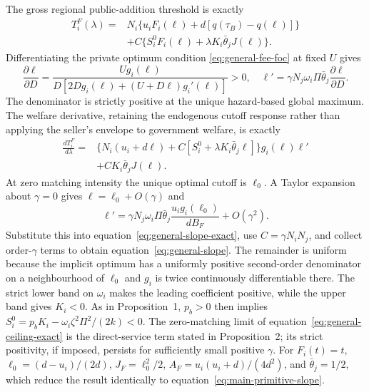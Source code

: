 The gross regional public-addition threshold is exactly
\begin{equation}
 \begin{split}
 T_i^F(\lambda)={}&N_i\bigl\{u_iF_i(\ell)
             +d[q(\tau_B)-q(\ell)]\bigr\}\\
 &+C\bigl\{S_i^0F_i(\ell)
          +\lambda K_i\bar\theta_j J(\ell)\bigr\}.
 \end{split}\label{eq:general-ceiling-exact}
\end{equation}
Differentiating the private optimum condition
\eqref{eq:general-fee-foc} at fixed $U$ gives
\begin{equation}
 \frac{\partial\ell}{\partial D}
 =\frac{U g_i(\ell)}{D[2Dg_i(\ell)+(U+D\ell)g_i'(\ell)]}>0,
 \quad
 \ell'=\gamma N_j\omega_i\Pi\bar\theta_j
              \frac{\partial\ell}{\partial D}.
 \label{eq:general-cutoff-response}
\end{equation}
The denominator is strictly positive at the unique
hazard-based global maximum. The welfare derivative, retaining the
endogenous cutoff response rather than applying the seller's envelope
to government welfare, is exactly
\begin{equation}
 \begin{split}
 \frac{dT_i^F}{d\lambda}={}&
 \bigl\{N_i(u_i+d\ell)+
   C[S_i^0+\lambda K_i\bar\theta_j\ell]\bigr\}
     g_i(\ell)\ell'\\
 &+CK_i\bar\theta_j J(\ell).
 \end{split}\label{eq:general-slope-exact}
\end{equation}
At zero matching intensity the unique optimal cutoff is
$\ell_0$. A Taylor expansion about $\gamma=0$ gives
$\ell=\ell_0+O(\gamma)$ and
\[
 \ell'=\gamma N_j\omega_i\Pi\bar\theta_j
   \frac{u_i g_i(\ell_0)}{d B_F}+O(\gamma^2).
\]
Substitute this into equation~\eqref{eq:general-slope-exact}, use
$C=\gamma N_iN_j$, and collect order-$\gamma$ terms to obtain
equation~\eqref{eq:general-slope}. The remainder is uniform because
the implicit optimum has a uniformly positive second-order
denominator on a neighbourhood of $\ell_0$ and $g_i$ is twice
continuously differentiable there. The strict lower band on
$\omega_i$ makes the leading coefficient positive, while the upper
band gives $K_i<0$. As in Proposition~1, $p_b>0$ then implies
$S_i^0=p_bK_i-\omega_i\zeta^2\Pi^2/(2k)<0$.
The zero-matching limit of equation~\eqref{eq:general-ceiling-exact}
is the direct-service term stated in Proposition~2;
its strict positivity, if imposed, persists for sufficiently small
positive $\gamma$. For $F_i(t)=t$,
$\ell_0=(d-u_i)/(2d)$, $J_F=\ell_0^2/2$,
$A_F=u_i(u_i+d)/(4d^2)$, and $\bar\theta_j=1/2$,
which reduce the result identically to equation~\eqref{eq:main-primitive-slope}.

